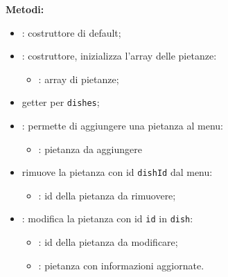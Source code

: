 \textbf{Metodi:}
\begin{itemize}
	\item {}: costruttore di default;
	\item {}: costruttore, inizializza l'array delle pietanze:
	\begin{itemize}
		\item {}: array di pietanze;
	\end{itemize}
	\item {} getter per \texttt{dishes};
	\item {}: permette di aggiungere una pietanza al menu:
	\begin{itemize}
		\item {}: pietanza da aggiungere
	\end{itemize}
	\item {} rimuove la pietanza con id \texttt{dishId} dal menu:
	\begin{itemize}
		\item {}: id della pietanza da rimuovere;
	\end{itemize}
	\item {}: modifica la pietanza con id \texttt{id} in \texttt{dish}:
	\begin{itemize}
		\item {}: id della pietanza da modificare;
		\item {}: pietanza con informazioni aggiornate.
	\end{itemize}
\end{itemize}